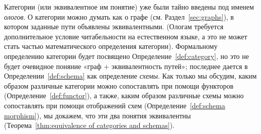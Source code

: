 \documentclass[CT4S-EN-RU]{subfiles}
\begin{document}
\begin{blockRUS}
Категории (или эквивалентное им понятие) уже были тайно введены под именем {\em ологов}. О категории можно думать как о графе (см. Раздел~\ref{sec:graphs}), в котором заданные пути объявлены эквивалентными. (Ологам требуется дополнительное условие читабельности на естественном языке, а это не может стать частью математического определения категории). Формальному определению категории будет посвящено Определение~\ref{def:category}, но это не будет очевидное поняние «граф $+$ эквивалентность путей»; последнее дается в Определении~\ref{def:schema} как определение {\em схемы}. Как только мы обсудим, каким образом различные категории можно сопоставлять при помощи функторов (Определение~\ref{def:functor}), а также, каким образом различные схемы можно сопоставлять при помощи отображений схем (Определение~\ref{def:schema morphism}), мы докажем, что эти два понятия эквивалентны (Теорема~\ref{thm:equivalence of categories and schemas}).
\end{blockRUS}
\end{document}

